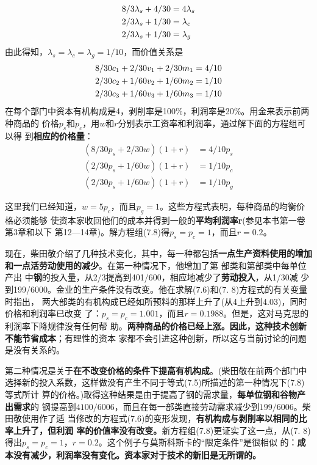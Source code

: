 \begin{align}
8/3 \lambda_s +4/30 &=4 \lambda_s \notag \\
2/3 \lambda_s+1/30 &=\lambda_c \notag \\
2/3 \lambda_s+1/30 &=\lambda_g
\end{align}
由此得知，$\lambda_s=\lambda_c=\lambda_g=1/10$，而价值关系是
\begin{gather}
8/30c_1+2/30v_1+2/30m_1=4/10  \notag \\
2/30c_2+1/60v_2+1/60m_2=1/10  \notag \\
2/30c_3+1/60v_3+1/60m_3=1/10
\end{gather}
在每个部门中资本有机构成是4，剥削率是100\%，利润率是20\%。用金来表示前两种商品的
价格$p_s和p_c$，用$w和r$分别表示工资率和利润率，通过解下面的方程组可以得
到\textbf{相应的价格量}：
\begin{equation}
\begin{aligned}
(8/30p_s+2/30w)(1+r) &=4/10p_s \\
(2/30p_s+1/60w)(1+r) &=1/10p_c \\
(2/30p_s+1/60w)(1+r) &=1/10p_g
\end{aligned}
\end{equation}

这里我们已经知道，$w=5p_c，而且p_g=1$。这些方程式表明，每种商品的均衡价格必须能够
使资本家收回他们的成本并得到一般的\textbf{平均利润率r}(参见本书第一卷第3章和以下
第12—14章)。解方程组(7.8)得$p_s=p_c=1，而且r=0.2$。

现在，柴田敬介绍了几种技术变化，其中，每一种都包括\textbf{一点生产资料使用的增加
  和一点活劳动使用的减少}。在第一种情况下，他增加了第 部类和第部类中每单位产出
中\textbf{钢}的投入量，从2/3提高到401/600，相应地减少了\textbf{劳动投入}，从1/30减
少到199/6000。金业的生产条件没有改变。他在求解(7.6)和(7. 8)方程式的有关变量时指出，
两大部类的有机构成已经如所预料的那样上升了(从4上升到4.03)，同时价格和利润率已改变
了：$p_s=p_c=1.001，而且r=0.1988$。但是，这对马克思的利润率下降规律没有任何帮
助。\textbf{两种商品的价格已经上涨。因此，这种技术创新不能节省成本}；有理性的资本
家都不会引进这种创新，所以这与当前讨论的问题是没有关系的。

第二种情况是关于\textbf{在不改变价格的条件下提高有机构成}。(柴田敬在前两个部门中
选择新的投入系数，这样做没有产生不同于等式(7.5)所描述的第一种情况下(7.8)等式所计
算的价格。)取得这种结果是由于提高了钢的需求量，\textbf{每单位钢和谷物产出需求}的
钢提高到$4100/6006$，而且在每一部类直接劳动需求减少到$199/6006$。柴田敬使用作了适
当修改的方程式(7.6)的变形发现，\textbf{有机构成与剥削率以相同的比率上升了，但利润
  率的价值率没有改变。}新方程组(7.8)更证实了这一点，从(7.
8)得出$p_s=p_c=1，r=0.2$。这个例子与莫斯科斯卡的“限定条件”是很相似
的：\textbf{成本没有减少，利润率没有变化。资本家对于技术的新旧是无所谓的。}

